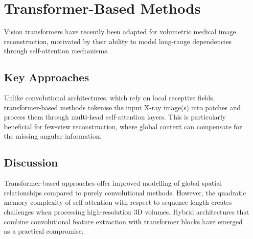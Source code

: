 
\section{Transformer-Based Methods}
\label{sec:transformer_methods}

Vision transformers have recently been adapted for volumetric medical image reconstruction, motivated by their ability to model long-range dependencies through self-attention mechanisms.

\subsection{Key Approaches}

Unlike convolutional architectures, which rely on local receptive fields, transformer-based methods tokenise the input X-ray image(s) into patches and process them through multi-head self-attention layers. This is particularly beneficial for few-view reconstruction, where global context can compensate for the missing angular information.


\subsection{Discussion}

Transformer-based approaches offer improved modelling of global spatial relationships compared to purely convolutional methods. However, the quadratic memory complexity of self-attention with respect to sequence length creates challenges when processing high-resolution 3D volumes. Hybrid architectures that combine convolutional feature extraction with transformer blocks have emerged as a practical compromise.

